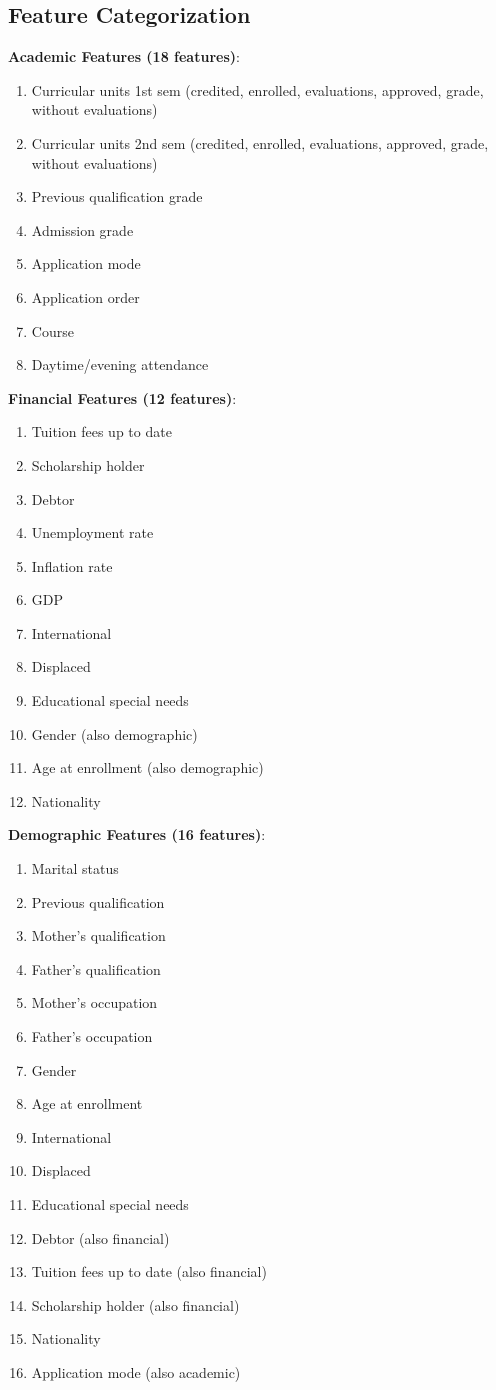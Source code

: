 \subsection{Feature Categorization}

\textbf{Academic Features (18 features)}:
\begin{enumerate}
\item Curricular units 1st sem (credited, enrolled, evaluations, approved, grade, without evaluations)
\item Curricular units 2nd sem (credited, enrolled, evaluations, approved, grade, without evaluations)
\item Previous qualification grade
\item Admission grade
\item Application mode
\item Application order
\item Course
\item Daytime/evening attendance
\end{enumerate}

\textbf{Financial Features (12 features)}:
\begin{enumerate}
\item Tuition fees up to date
\item Scholarship holder
\item Debtor
\item Unemployment rate
\item Inflation rate
\item GDP
\item International
\item Displaced
\item Educational special needs
\item Gender (also demographic)
\item Age at enrollment (also demographic)
\item Nationality
\end{enumerate}

\textbf{Demographic Features (16 features)}:
\begin{enumerate}
\item Marital status
\item Previous qualification
\item Mother's qualification
\item Father's qualification
\item Mother's occupation
\item Father's occupation
\item Gender
\item Age at enrollment
\item International
\item Displaced
\item Educational special needs
\item Debtor (also financial)
\item Tuition fees up to date (also financial)
\item Scholarship holder (also financial)
\item Nationality
\item Application mode (also academic)
\end{enumerate}

